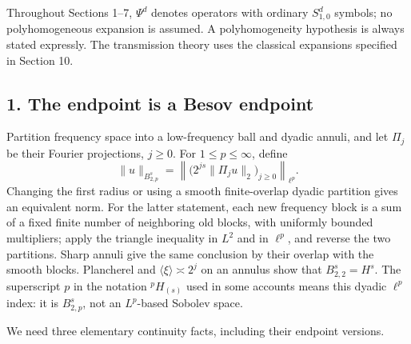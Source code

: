 \documentclass[
  11pt,
]{article}
\makeatletter
\let\ReaderOriginalAnchorStart\hyper@anchorstart
\let\ReaderOriginalAnchorEnd\hyper@anchorend
\let\ReaderPendingAliases\@empty
\def\ReaderArmAliases#1{\gdef\ReaderPendingAliases{#1}}
\def\hyper@anchorstart#1{\ReaderIfNativeAnchorTF{#1}{\ReaderPendingAliases\global\let\ReaderPendingAliases\@empty}{}\ReaderOriginalAnchorStart{#1}}
\makeatother
\begin{document}
Throughout Sections 1--7, \(\Psi^d\) denotes operators with ordinary
\(S^d_{1,0}\) symbols; no polyhomogeneous expansion is assumed. A
polyhomogeneity hypothesis is always stated expressly. The transmission
theory uses the classical expansions specified in Section 10.

\ReaderArmAliases{\ReaderOriginalAnchorStart{AN03-CN-001}\ReaderOriginalAnchorEnd\begingroup\expandafter\def\csname @currentHref\endcsname{AN03-CN-001}\label{AN03-CN-001}\endgroup\ReaderOriginalAnchorStart{an03-cn-001-the-endpoint-is-a-besov-endpoint}\ReaderOriginalAnchorEnd\begingroup\expandafter\def\csname @currentHref\endcsname{an03-cn-001-the-endpoint-is-a-besov-endpoint}\label{an03-cn-001-the-endpoint-is-a-besov-endpoint}\endgroup\ReaderOriginalAnchorStart{1-the-endpoint-is-a-besov-endpoint}\ReaderOriginalAnchorEnd\begingroup\expandafter\def\csname @currentHref\endcsname{1-the-endpoint-is-a-besov-endpoint}\label{1-the-endpoint-is-a-besov-endpoint}\endgroup\ReaderOriginalAnchorStart{the-endpoint-is-a-besov-endpoint}\ReaderOriginalAnchorEnd}
\subsection{1. The endpoint is a Besov
endpoint}\label{the-endpoint-is-a-besov-endpoint}

Partition frequency space into a low-frequency ball and dyadic annuli,
and let \(\Pi_j\) be their Fourier projections, \(j\geq0\). For
\(1\leq p\leq\infty\), define \[
\|u\|_{B^s_{2,p}}
=\left\|\big(2^{js}\|\Pi_j u\|_2\big)_{j\geq0}\right\|_{\ell^p}.
\tag{C2}
\] Changing the first radius or using a smooth finite-overlap dyadic
partition gives an equivalent norm. For the latter statement, each new
frequency block is a sum of a fixed finite number of neighboring old
blocks, with uniformly bounded multipliers; apply the triangle
inequality in \(L^2\) and in \(\ell^p\), and reverse the two partitions.
Sharp annuli give the same conclusion by their overlap with the smooth
blocks. Plancherel and \(\langle\xi\rangle\asymp2^j\) on an annulus show
that \(B^s_{2,2}=H^s\). The superscript \(p\) in the notation
\({}^pH_{(s)}\) used in some accounts means this dyadic \(\ell^p\)
index: it is \(B^s_{2,p}\), not an \(L^p\)-based Sobolev space.

We need three elementary continuity facts, including their endpoint
versions.
\end{document}
